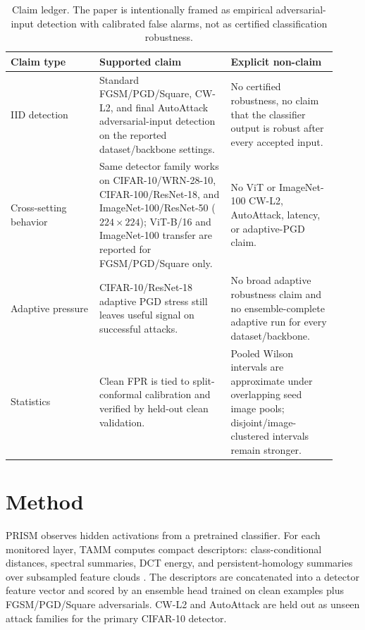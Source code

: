 \documentclass{article}
\newcommand{\prism}{\textsc{PRISM}\xspace}
\newcommand{\tamm}{\textsc{TAMM}\xspace}
\begin{document}
\begin{table}[t]
\centering
\small
\setlength{\tabcolsep}{4pt}
\begin{tabular}{p{0.25\linewidth}p{0.37\linewidth}p{0.30\linewidth}}
\toprule
Claim type & Supported claim & Explicit non-claim \\
\midrule
IID detection & Standard FGSM/PGD/Square, CW-L2, and final AutoAttack adversarial-input detection on the reported dataset/backbone settings. & No certified robustness, no claim that the classifier output is robust after every accepted input. \\
Cross-setting behavior & Same detector family works on CIFAR-10/WRN-28-10, CIFAR-100/ResNet-18, and ImageNet-100/ResNet-50 ($224\times224$); ViT-B/16 and ImageNet-100 transfer are reported for FGSM/PGD/Square only. & No ViT or ImageNet-100 CW-L2, AutoAttack, latency, or adaptive-PGD claim. \\
Adaptive pressure & CIFAR-10/ResNet-18 adaptive PGD stress still leaves useful signal on successful attacks. & No broad adaptive robustness claim and no ensemble-complete adaptive run for every dataset/backbone. \\
Statistics & Clean FPR is tied to split-conformal calibration and verified by held-out clean validation. & Pooled Wilson intervals are approximate under overlapping seed image pools; disjoint/image-clustered intervals remain stronger. \\
\bottomrule
\end{tabular}
\caption{Claim ledger. The paper is intentionally framed as empirical adversarial-input detection with calibrated false alarms, not as certified classification robustness.}
\label{tab:claim_ledger}
\end{table}

\section{Method}
\prism observes hidden activations from a pretrained classifier. For each monitored layer, \tamm computes compact descriptors: class-conditional distances, spectral summaries, DCT energy, and persistent-homology summaries over subsampled feature clouds \citep{edelsbrunner2010computational,gudhi2015}. The descriptors are concatenated into a detector feature vector and scored by an ensemble head trained on clean examples plus FGSM/PGD/Square adversarials. CW-L2 and AutoAttack are held out as unseen attack families for the primary CIFAR-10 detector.
\end{document}
